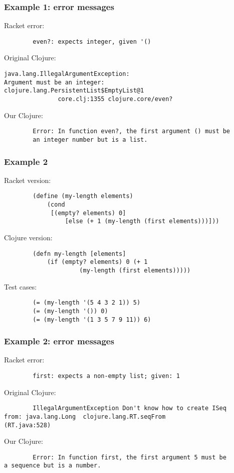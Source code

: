 \documentclass{beamer}
\begin{document}
\begin{frame}[fragile]
\frametitle{Example 1: error messages}
Racket error:
\begin{verbatim}
		even?: expects integer, given '()
\end{verbatim}

Original Clojure:
\begin{verbatim}
java.lang.IllegalArgumentException: 
Argument must be an integer: 
clojure.lang.PersistentList$EmptyList@1
               core.clj:1355 clojure.core/even?	
\end{verbatim}

Our Clojure: 
\begin{verbatim}
		Error: In function even?, the first argument () must be
		an integer number but is a list.
\end{verbatim}
\end{frame}

\begin{frame}[fragile]
\frametitle{Example 2}
Racket version:
\begin{verbatim}
		(define (my-length elements)
  			(cond
 			 [(empty? elements) 0]
			 	 [else (+ 1 (my-length (first elements)))]))
\end{verbatim}
Clojure version:  
\begin{verbatim}
		(defn my-length [elements]
 			(if (empty? elements) 0 (+ 1 
                     (my-length (first elements)))))
\end{verbatim}
Test cases:
\begin{verbatim}
		(= (my-length '(5 4 3 2 1)) 5)
		(= (my-length '()) 0)
		(= (my-length '(1 3 5 7 9 11)) 6)
\end{verbatim}
\end{frame}


\begin{frame}[fragile]
\frametitle{Example 2: error messages}
Racket error:
\begin{verbatim}
		first: expects a non-empty list; given: 1	
\end{verbatim}

Original Clojure:
\begin{verbatim}
		IllegalArgumentException Don't know how to create ISeq  
from: java.lang.Long  clojure.lang.RT.seqFrom 
(RT.java:528)
\end{verbatim}

Our Clojure: 
\begin{verbatim}
		Error: In function first, the first argument 5 must be 
a sequence but is a number.
\end{verbatim}
\end{frame}
\end{document}
